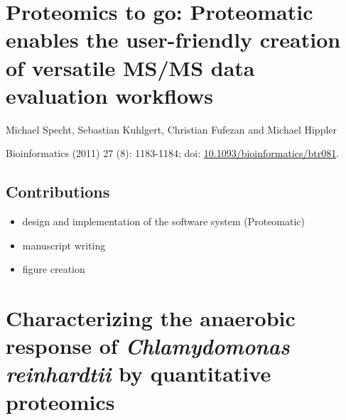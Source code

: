 \cleardoublepage
\section{Proteomics to go: Proteomatic enables the user-friendly creation of versatile MS/MS data evaluation workflows}

Michael Specht, Sebastian Kuhlgert, Christian Fufezan and Michael Hippler

Bioinformatics (2011) 27 (8): 1183-1184; doi: \href{http://dx.doi.org/10.1093/bioinformatics/btr081}{10.1093/bioinformatics/btr081}.

\subsection*{Contributions}

\begin{itemize}
\item design and implementation of the software system (Proteomatic)
\item manuscript writing
\item figure creation
\end{itemize}

{}

\cleardoublepage
\section{Characterizing the anaerobic response of {\em Chlamydomonas reinhardtii} by quantitative proteomics}


